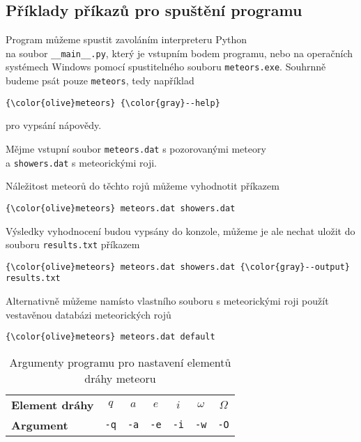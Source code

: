 \subsection{Příklady příkazů pro spuštění programu\label{sec:practical:examples}}%
Program můžeme spustit zavoláním interpreteru Python \\na soubor \texttt{\_\_main\_\_.py}, který je vstupním bodem programu, nebo na operačních systémech Windows pomocí spustitelného souboru \texttt{meteors.exe}. Souhrnně budeme psát pouze \texttt{meteors}, tedy například
\begin{Verbatim}[commandchars=\\\{\},gobble=4,formatcom=\small]
    {\color{olive}meteors} {\color{gray}--help}
\end{Verbatim}
pro vypsání nápovědy.

\medskip

Mějme vstupní soubor \texttt{meteors.dat} s pozorovanými meteory \\a \texttt{showers.dat} s meteorickými roji.

Náležitost meteorů do těchto rojů můžeme vyhodnotit příkazem
\begin{Verbatim}[commandchars=\\\{\},gobble=4,formatcom=\small]
    {\color{olive}meteors} meteors.dat showers.dat
\end{Verbatim}
Výsledky vyhodnocení budou vypsány do konzole, můžeme je ale nechat uložit do souboru \texttt{results.txt} příkazem
\begin{Verbatim}[commandchars=\\\{\},gobble=4,formatcom=\small]
    {\color{olive}meteors} meteors.dat showers.dat {\color{gray}--output} results.txt
\end{Verbatim}
Alternativně můžeme namísto vlastního souboru s meteorickými roji použít vestavěnou databázi meteorických rojů
\begin{Verbatim}[commandchars=\\\{\},gobble=4,formatcom=\small]
    {\color{olive}meteors} meteors.dat default
\end{Verbatim}

\begin{table}[!h]
    \centering
    \caption{Argumenty programu pro nastavení elementů dráhy meteoru}
    \begin{tabular}[pos]{|l|cccccc|}
        \hline
        \textbf{Element dráhy} & $q$ & $a$ & $e$ & $i$ & $\omega$ & $\Omega$ \\
        \textbf{Argument} & \texttt{-q} & \texttt{-a} & \texttt{-e} & \texttt{-i} & \texttt{-w} & \texttt{-O} \\
        \hline
    \end{tabular}
    \label{tbl:practical:arguments}
\end{table}

